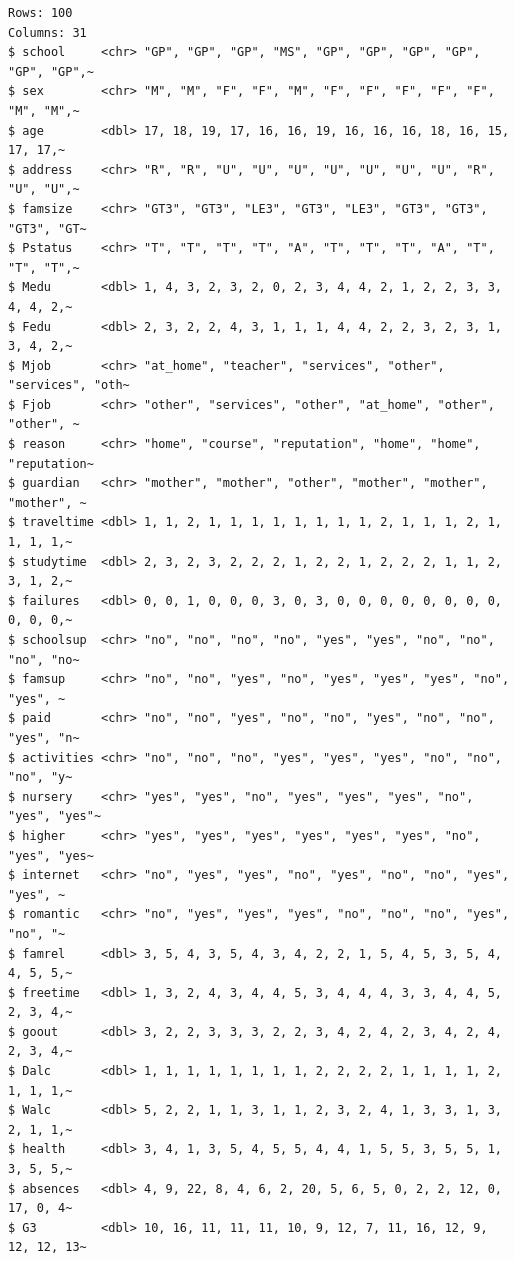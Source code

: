 \documentclass[
  a4paper,
  DIV=11,
  oneside]{scrreprt}
\begin{document}
\begin{verbatim}
Rows: 100
Columns: 31
$ school     <chr> "GP", "GP", "GP", "MS", "GP", "GP", "GP", "GP", "GP", "GP",~
$ sex        <chr> "M", "M", "F", "F", "M", "F", "F", "F", "F", "F", "M", "M",~
$ age        <dbl> 17, 18, 19, 17, 16, 16, 19, 16, 16, 16, 18, 16, 15, 17, 17,~
$ address    <chr> "R", "R", "U", "U", "U", "U", "U", "U", "U", "R", "U", "U",~
$ famsize    <chr> "GT3", "GT3", "LE3", "GT3", "LE3", "GT3", "GT3", "GT3", "GT~
$ Pstatus    <chr> "T", "T", "T", "T", "A", "T", "T", "T", "A", "T", "T", "T",~
$ Medu       <dbl> 1, 4, 3, 2, 3, 2, 0, 2, 3, 4, 4, 2, 1, 2, 2, 3, 3, 4, 4, 2,~
$ Fedu       <dbl> 2, 3, 2, 2, 4, 3, 1, 1, 1, 4, 4, 2, 2, 3, 2, 3, 1, 3, 4, 2,~
$ Mjob       <chr> "at_home", "teacher", "services", "other", "services", "oth~
$ Fjob       <chr> "other", "services", "other", "at_home", "other", "other", ~
$ reason     <chr> "home", "course", "reputation", "home", "home", "reputation~
$ guardian   <chr> "mother", "mother", "other", "mother", "mother", "mother", ~
$ traveltime <dbl> 1, 1, 2, 1, 1, 1, 1, 1, 1, 1, 1, 2, 1, 1, 1, 2, 1, 1, 1, 1,~
$ studytime  <dbl> 2, 3, 2, 3, 2, 2, 2, 1, 2, 2, 1, 2, 2, 2, 1, 1, 2, 3, 1, 2,~
$ failures   <dbl> 0, 0, 1, 0, 0, 0, 3, 0, 3, 0, 0, 0, 0, 0, 0, 0, 0, 0, 0, 0,~
$ schoolsup  <chr> "no", "no", "no", "no", "yes", "yes", "no", "no", "no", "no~
$ famsup     <chr> "no", "no", "yes", "no", "yes", "yes", "yes", "no", "yes", ~
$ paid       <chr> "no", "no", "yes", "no", "no", "yes", "no", "no", "yes", "n~
$ activities <chr> "no", "no", "no", "yes", "yes", "yes", "no", "no", "no", "y~
$ nursery    <chr> "yes", "yes", "no", "yes", "yes", "yes", "no", "yes", "yes"~
$ higher     <chr> "yes", "yes", "yes", "yes", "yes", "yes", "no", "yes", "yes~
$ internet   <chr> "no", "yes", "yes", "no", "yes", "no", "no", "yes", "yes", ~
$ romantic   <chr> "no", "yes", "yes", "yes", "no", "no", "no", "yes", "no", "~
$ famrel     <dbl> 3, 5, 4, 3, 5, 4, 3, 4, 2, 2, 1, 5, 4, 5, 3, 5, 4, 4, 5, 5,~
$ freetime   <dbl> 1, 3, 2, 4, 3, 4, 4, 5, 3, 4, 4, 4, 3, 3, 4, 4, 5, 2, 3, 4,~
$ goout      <dbl> 3, 2, 2, 3, 3, 3, 2, 2, 3, 4, 2, 4, 2, 3, 4, 2, 4, 2, 3, 4,~
$ Dalc       <dbl> 1, 1, 1, 1, 1, 1, 1, 1, 2, 2, 2, 2, 1, 1, 1, 1, 2, 1, 1, 1,~
$ Walc       <dbl> 5, 2, 2, 1, 1, 3, 1, 1, 2, 3, 2, 4, 1, 3, 3, 1, 3, 2, 1, 1,~
$ health     <dbl> 3, 4, 1, 3, 5, 4, 5, 5, 4, 4, 1, 5, 5, 3, 5, 5, 1, 3, 5, 5,~
$ absences   <dbl> 4, 9, 22, 8, 4, 6, 2, 20, 5, 6, 5, 0, 2, 2, 12, 0, 17, 0, 4~
$ G3         <dbl> 10, 16, 11, 11, 11, 10, 9, 12, 7, 11, 16, 12, 9, 12, 12, 13~
\end{verbatim}
\end{document}
